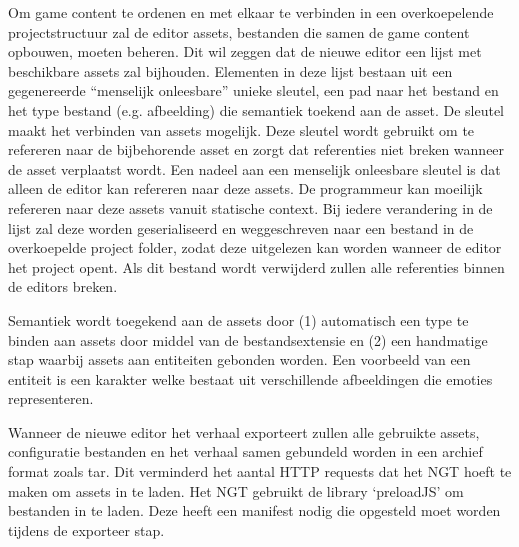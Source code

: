 Om game content te ordenen en met elkaar te verbinden in een overkoepelende projectstructuur zal de editor assets, bestanden die samen de game content opbouwen, moeten beheren. Dit wil zeggen dat de nieuwe editor een lijst met beschikbare assets zal bijhouden. Elementen in deze lijst bestaan uit een gegenereerde “menselijk onleesbare” unieke sleutel, een pad naar het bestand en het type bestand (e.g. afbeelding) die semantiek toekend aan de asset. De sleutel maakt het verbinden van assets mogelijk. Deze sleutel wordt gebruikt om te refereren naar de bijbehorende asset en zorgt dat referenties niet breken wanneer de asset verplaatst wordt. Een nadeel aan een menselijk onleesbare sleutel is dat alleen de editor kan refereren naar deze assets. De programmeur kan moeilijk refereren naar deze assets vanuit statische context. Bij iedere verandering in de lijst zal deze worden geserialiseerd en weggeschreven naar een bestand in de overkoepelde project folder, zodat deze uitgelezen kan worden wanneer de editor het project opent. Als dit bestand wordt verwijderd zullen alle referenties binnen de editors breken.

Semantiek wordt toegekend aan de assets door (1) automatisch een type te binden aan assets door middel van de bestandsextensie en (2) een handmatige stap waarbij assets aan entiteiten gebonden worden. Een voorbeeld van een entiteit is een karakter welke bestaat uit verschillende afbeeldingen die emoties representeren.

Wanneer de nieuwe editor het verhaal exporteert zullen alle gebruikte assets, configuratie bestanden en het verhaal samen gebundeld worden in een archief format zoals tar. Dit verminderd het aantal HTTP requests dat het NGT hoeft te maken om assets in te laden. Het NGT gebruikt de library ‘preloadJS’ om bestanden in te laden. Deze heeft een manifest nodig die opgesteld moet worden tijdens de exporteer stap.
